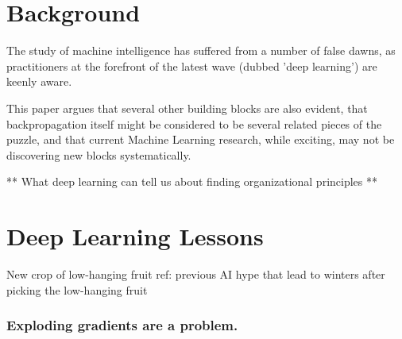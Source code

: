 \documentclass[citeauthoryear]{llncs}
\begin{document}
\section{Background}
The study of machine intelligence has suffered from a number of false dawns, 
as practitioners at the forefront of the latest wave (dubbed 'deep learning') 
are keenly aware.  

This paper argues that several other building blocks are also evident, 
that backpropagation itself might be considered to be several related pieces of the puzzle,
and that current Machine Learning research, while exciting, may not be
discovering new blocks systematically.

  
**  What deep learning can tell us about finding organizational principles ** 


%
%
%

\section{Deep Learning Lessons}

  New crop of low-hanging fruit 
    ref: previous AI hype that lead to winters after picking the low-hanging fruit

\subsubsection*{Exploding gradients are a problem.}
\end{document}
